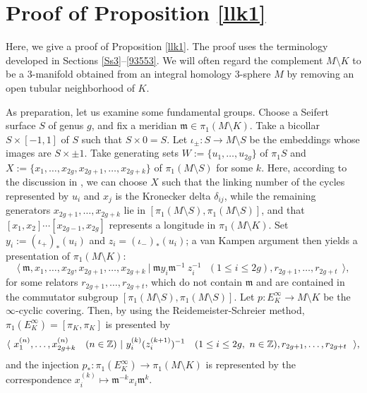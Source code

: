 \documentclass{article}
\theoremstyle{plain}
\theoremstyle{definition}
\newcommand{\ra}{\rightarrow}
\newcommand{\Z}{{\Bbb Z}}
\begin{document}
{\appendix

\section{Proof of Proposition \ref{llk1}} %
\label{Ap2}
Here, we give a proof of Proposition \ref{llk1}. The proof uses the terminology developed in Sections \ref{Ss3}--\ref{93553}. We will often regard the complement $M \setminus K $ to be a 3-manifold obtained from an integral homology 3-sphere $M $ by removing an open tubular neighborhood of $K$.

As preparation, let us examine some fundamental groups.
Choose a Seifert surface $S$ of genus $g$, and fix a meridian $\mathfrak{m} \in \pi_1(M \setminus K)$.
Take a bicollar $S \times [-1,1]$ of $S$ such that $S \times {0} = S$.
Let $\iota_{\pm}: S \to M \setminus S$ be the embeddings whose images are $S \times {\pm 1}$. Take generating sets $W:=\{ u_1, \dots, u_{2g} \}$ of $\pi_1 S $ and $ X:=\{ x_1, \dots, x_{2g}, x_{2g+1}, \dots, x_{2g+k} \} $ of $ \pi_1(M \setminus S)$ for some $k$. Here, according to the discussion in \cite[Page 480]{Tr}, we can choose $X$ such that the linking number of the cycles represented by $u_i$ and $x_j$ is the Kronecker delta $\delta_{ij}$, while the remaining generators $x_{2g+1}, \dots, x_{2g+k} $ lie in $[\pi_1(M\setminus S),\pi_1(M \setminus S) ]$, and that $[ x_1, x_2] \cdots [x_{2g-1} , x_{2g}] $ represents a longitude in $\pi_1(M \setminus K) $. Set $y_i:=(\iota_+)_* (u_i)$ and $z_i=(\iota_-)_* (u_i)$; a van Kampen argument then yields a presentation of $ \pi_1(M \setminus K)$:
\begin{equation}\label{oo456} \langle \ \mathfrak{m} , x_1, \dots, x_{2g}, x_{2g+1}, \dots, x_{2g+k}\ | \ \mathfrak{m} y_i \mathfrak{m}^{-1}\ z_i^{-1} \ \ \ (1 \leq i \leq 2g) , r_{2g+1},\dots,r_{2g+t} \ \ \rangle, \end{equation}
for some relators $ r_{2g+1},\dots,r_{2g+t}$, which do not contain $ \mathfrak{m}$ and are contained in the commutator subgroup $[ \pi_1(M \setminus S), \pi_1(M \setminus S) ] $. Let $p: E_K^{\infty} \ra M \setminus K $ be the $\infty$-cyclic covering. Then, by using the Reidemeister-Schreier method, $ \pi_1(E_K^{\infty})= [\pi_K,\pi_K]$ is presented by
\begin{equation}\label{lklk} \langle \ x_1^{(n)}, \dots, x_{2g+k}^{(n)} \ \ \ ( n\in \Z
) \ | \ y_i^{(k)} (z_i^{(k+1)})^{-1} \ \ \ (1 \leq i \leq 2g, \ n \in \Z), r_{2g+1},\dots,r_{2g+t} \ \ \rangle, \end{equation}
and the injection $ p_*: \pi_1(E_K^{\infty}) \ra \pi_1(M \setminus K)$ is represented by the correspondence $ x_i^{(k)} \mapsto \mathfrak{m}^{-k} x_i \mathfrak{m}^k. $

}
\end{document}
